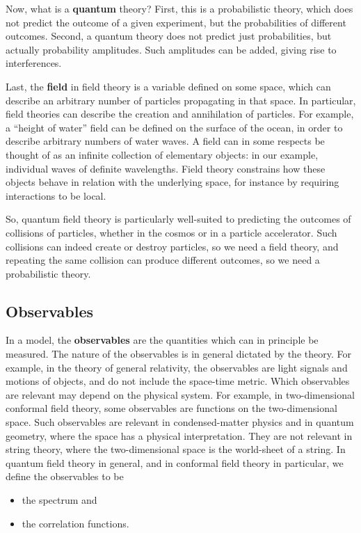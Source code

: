 \documentclass[12pt, a4paper, notitlepage, twoside]{report}
\numberwithin{equation}{section}
\theoremstyle{break}
\begin{document}
Now, what is a \textbf{\boldmath quantum} theory? First, this is a probabilistic theory, which does not predict the outcome of a given experiment, but the probabilities of different outcomes.
Second, a quantum theory does not predict just probabilities, but actually probability amplitudes.
Such amplitudes can be added, giving rise to interferences. 

Last, the \textbf{\boldmath field} in field theory is a variable defined on some space, which can describe an arbitrary number of particles propagating in that space.
In particular, field theories can describe the creation and annihilation of particles.
For example, a ``height of water'' field can be defined on the surface of the ocean, in order to describe arbitrary numbers of water waves.
A field can in some respects be thought of as an infinite collection of elementary objects: in our example, individual waves of definite wavelengths.
Field theory constrains how these objects behave in relation with the underlying space, for instance by requiring interactions to be local.

So, quantum field theory is particularly well-suited to predicting the outcomes of collisions of particles, whether in the cosmos or in a particle accelerator.
Such collisions can indeed create or destroy particles, so we need a field theory, and repeating the same collision can produce different outcomes, so we need a probabilistic theory. 

\subsection{Observables}

In a model, the \textbf{\boldmath observables} are the quantities which can in principle be measured.
The nature of the observables is in general dictated by the theory.
For example, in the theory of general relativity, the observables are light signals and motions of objects, and do not include the space-time metric. 
Which observables are relevant may depend on the physical system.
For example, in two-dimensional conformal field theory, some observables are functions on the two-dimensional space.
Such observables are relevant in condensed-matter physics and in quantum geometry, where the space has a physical interpretation.
They are not relevant in string theory, where the two-dimensional space is the world-sheet of a string. 
In quantum field theory in general, and in conformal field theory in particular, we define the observables to be 
\begin{itemize}
 \item the spectrum and
\item the correlation functions.
\end{itemize}
\end{document}
